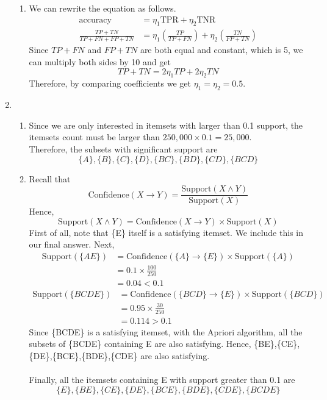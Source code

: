 \documentclass{article}
\begin{document}
\begin{enumerate}
\begin{enumerate}
        \item We can rewrite the equation as follows.
        \begin{align*}
            \text{accuracy} &= \eta_1\text{TPR}+\eta_2\text{TNR}\\
            \frac{TP+TN}{TP+FN+FP+TN} &= \eta_1\left(\frac{TP}{TP+FN}\right)+\eta_2\left(\frac{TN}{FP+TN}\right)
        \end{align*}
        Since $TP+FN$ and $FP+TN$ are both equal and constant, which is 5, we can multiply both sides by 10 and get
        \[TP+TN=2\eta_1TP+2\eta_2TN\]
        Therefore, by comparing coefficients we get $\eta_1=\eta_2=0.5$.
    \end{enumerate}
    
    \item
    \begin{enumerate}
        \item Since we are only interested in itemsets with larger than 0.1 support, the itemsets count must be larger than $250,000\times0.1=25,000$.\\
        Therefore, the subsets with significant support are \[\{A\},\{B\},\{C\},\{D\},\{BC\},\{BD\},\{CD\},\{BCD\}\]
        
        \item Recall that \[\text{Confidence}(X \rightarrow Y) = \frac{\text{Support}(X \wedge Y)}{\text{Support}(X)}\]
        Hence,
        \[\text{Support}(X \wedge Y)=\text{Confidence}(X \rightarrow Y) \times \text{Support}(X)\]
        First of all, note that \{E\} itself is a satisfying itemset. We include this in our final answer. Next,
        \begin{align*}
            \text{Support}(\{AE\}) &= \text{Confidence}(\{A\} \rightarrow \{E\}) \times \text{Support}(\{A\})\\
            &= 0.1 \times \frac{100}{250}\\
            &= 0.04 < 0.1
        \end{align*}
        \begin{align*}
            \text{Support}(\{BCDE\}) &= \text{Confidence}(\{BCD\} \rightarrow \{E\}) \times \text{Support}(\{BCD\})\\
            &= 0.95 \times \frac{30}{250}\\
            &= 0.114 > 0.1
        \end{align*}
        Since \{BCDE\} is a satisfying itemset, with the Apriori algorithm, all the subsets of \{BCDE\} containing E are also satisfying. Hence, \{BE\},\{CE\},\{DE\},\{BCE\},\{BDE\},\{CDE\} are also satisfying.\\\\
        Finally, all the itemsets containing E with support greater than 0.1 are
        \[\{E\},\{BE\},\{CE\},\{DE\},\{BCE\},\{BDE\},\{CDE\},\{BCDE\}\]
        

\end{enumerate}
\end{enumerate}
\end{document}
